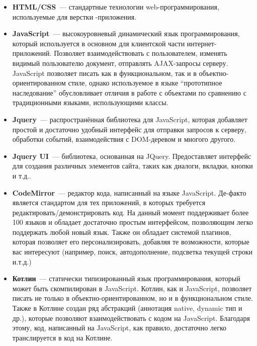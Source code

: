 \begin{itemize}
	\item \textbf{HTML/CSS}~--- стандартные технологии web-программирования, используемые для верстки -приложения.
	\item \textbf{JavaScript}~--- высокоуровневый динамический язык программирования, который используется в основном для клиентской части интернет-приложений. Позволяет взаимодействовать с пользователем, изменять видимый пользователю документ, отправлять AJAX-запросы серверу. JavaScript позволяет писать как в функциональном, так и в объектно-ориентированном стиле, однако используемое в языке ``прототипное наследование'' обусловливает отличия в работе с объектами по сравнению с традиционными языками, использующими классы.
	\item \textbf{Jquery}\cite{jquery}~--- распространённая библиотека для JavaScript, которая добавляет простой и достаточно удобный интерфейс для отправки запросов к серверу, обработки событий, взаимодействия с DOM-деревом и многого другого.
	\item \textbf{Jquery UI}\cite{jqueryui}~--- библиотека, основанная на JQuery. Предоставляет интерфейс для создания различных элементов сайта, таких как диалоги, вкладки, кнопки и т.д..
	\item \textbf{CodeMirror}\cite{codemirror}~--- редактор кода, написанный на языке JavaScript. Де-факто является стандартом для тех приложений, в которых требуется редактировать/демонстрировать код. На данный момент поддерживает более 100 языков и обладает достаточно простым интерфейсом, позволяющим легко поддержать любой новый язык. Также он обладает системой плагинов, которая позволяет его персонализировать, добавляя те возможности, которые вас интересуют (например, поиск, автодополнение, подсветка текущей строки и.т.д.)
	\item \textbf{Котлин}\cite{project_kotlin}~--- статически типизированный  язык программирования, который может быть скомпилирован в JavaScript. Котлин, как и Java\-Script, позволяет писать не только в объектно-ориентир\-ованном, но и в функциональном стиле. Также в Котлине создан ряд абстракций (аннотация native, dynamic тип и др.), которые позволяют взаимодействовать с кодом на JavaScript. Благодаря этому, код, написанный на JavaScript, как правило, достаточно легко транслируется в код на Котлине. 
\end{itemize}

